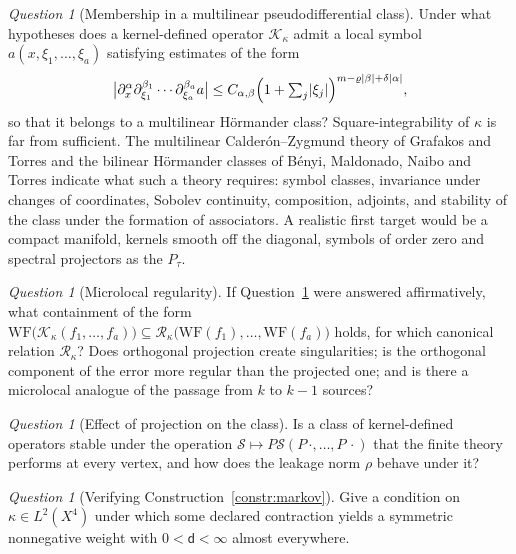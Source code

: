 \documentclass[11pt]{amsart}
\theoremstyle{definition}
\theoremstyle{remark}
\newtheorem{question}[theorem]{Question}
\newcommand{\Kop}{\mathcal K}
\begin{document}
\begin{question}[Membership in a multilinear pseudodifferential class]
\label{q:psido}
Under what hypotheses does a kernel-defined operator $\Kop_\kappa$ admit a local symbol
$a(x,\xi_1,\ldots,\xi_a)$ satisfying estimates of the form
\[
 \bigl\lvert\partial_x^{\alpha}\partial_{\xi_1}^{\beta_1}\cdots
 \partial_{\xi_a}^{\beta_a}a\bigr\rvert
 \le C_{\alpha,\beta}\Bigl(1+\textstyle\sum_j\lvert\xi_j\rvert\Bigr)^{m-\varrho\lvert\beta\rvert+\delta\lvert\alpha\rvert},
\]
so that it belongs to a multilinear H\"ormander class? Square-integrability of $\kappa$ is
far from sufficient. The multilinear Calder\'on--Zygmund theory of Grafakos and Torres
\cite{GrafakosTorres2002} and the bilinear H\"ormander classes of B\'enyi, Maldonado,
Naibo and Torres \cite{BenyiMaldonadoNaiboTorres2010} indicate what such a theory requires:
symbol classes, invariance under changes of coordinates, Sobolev continuity, composition,
adjoints, and stability of the class under the formation of associators. A realistic first
target would be a compact manifold, kernels smooth off the diagonal, symbols of order zero
and spectral projectors as the $P_\tau$.
\end{question}

\begin{question}[Microlocal regularity]
\label{q:microlocal}
If Question~\ref{q:psido} were answered affirmatively, what containment of the form
$\mathrm{WF}\bigl(\Kop_\kappa(f_1,\ldots,f_a)\bigr)\subseteq
\mathcal R_\kappa\bigl(\mathrm{WF}(f_1),\ldots,\mathrm{WF}(f_a)\bigr)$ holds, for which
canonical relation $\mathcal R_\kappa$? Does orthogonal projection create singularities;
is the orthogonal component of the error more regular than the projected one; and is there
a microlocal analogue of the passage from $k$ to $k-1$ sources?
\end{question}

\begin{question}[Effect of projection on the class]
\label{q:projclass}
Is a class of kernel-defined operators stable under the operation
$\mathcal S\mapsto P\mathcal S(P\,\cdot,\ldots,P\,\cdot)$ that the finite theory performs
at every vertex, and how does the leakage norm $\rho$ behave under it?
\end{question}

\begin{question}[Verifying Construction~\ref{constr:markov}]
\label{q:markov}
Give a condition on $\kappa\in L^{2}(X^{4})$ under which some declared contraction yields a
symmetric nonnegative weight with $0<\mathsf d<\infty$ almost everywhere.
\end{question}
\end{document}
